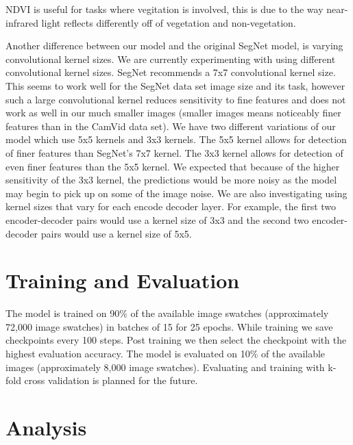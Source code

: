 \documentclass[12pt]{article}
\begin{document}
NDVI is useful for tasks where vegitation is involved, this is due to the way near-infrared light reflects differently off of vegetation and non-vegetation.

Another difference between our model and the original SegNet model, is varying convolutional kernel sizes. We are currently experimenting with using different convolutional kernel sizes. SegNet recommends a 7x7 convolutional kernel size. This seems to work well for the SegNet data set image size and its task, however such a large convolutional kernel reduces sensitivity to fine features and does not work as well in our much smaller images (smaller images means noticeably finer features than in the CamVid data set). We have two different variations of our model which use 5x5 kernels and 3x3 kernels. The 5x5 kernel allows for detection of finer features than SegNet's 7x7 kernel. The 3x3 kernel allows for detection of even finer features than the 5x5 kernel. We expected that because of the higher sensitivity of the 3x3 kernel, the predictions would be more noisy as the model may begin to pick up on some of the image noise. We are also investigating using kernel sizes that vary for each encode decoder layer. For example, the first two encoder-decoder pairs would use a kernel size of 3x3 and the second two encoder-decoder pairs would use a kernel size of 5x5.

\section{Training and Evaluation}
The model is trained on 90\% of the available image swatches (approximately 72,000 image swatches) in batches of 15 for 25 epochs. While training we save checkpoints every 100 steps. Post training we then select the checkpoint with the highest evaluation accuracy. The model is evaluated on 10\% of the available images (approximately 8,000 image swatches). Evaluating and training with k-fold cross validation is planned for the future.

\section{Analysis}

\begin{figure}
\end{figure}
\end{document}
